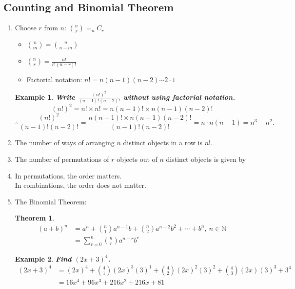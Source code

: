 \documentclass[12pt, a4paper]{article}
\newtheorem{theorem}{Theorem}[subsection]
\newtheorem{example}{Example}[subsection]
\begin{document}
\subsection{Counting and Binomial Theorem}
\begin{enumerate}
  \item Choose $r$ from $n$: {\color{red}$\binom{n}{r}=_nC_r$}
  \begin{itemize}
    \item {\color{red}$\binom{n}{m}=\binom{n}{n-m}$}
    \item {\color{red}$\binom{n}{r}=\frac{n!}{r!(n-r)!}$}
    \item Factorial notation: $n!=n(n-1)(n-2)\cdots 2\cdot 1$\\
  \end{itemize}
  \begin{example}
    \textbf{Write $\frac{(n!)^2}{(n-1)!(n-2)!}$ without using factorial notation.}
    $$(n!)^2=n!\times n!=n(n-1)!\times n(n-1)(n-2)!$$
    $$\therefore \frac{(n!)^2}{(n-1)!(n-2)!}=\frac{n(n-1)!\times n(n-1)(n-2)!}{(n-1)!(n-2)!}=n\cdot n(n-1)=n^3-n^2.$$
  \end{example}
  \item The number of ways of arranging $n$ distinct objects in a row is {\color{red}$n!$}.
  \item The number of permutations of $r$ objects out of $n$ distinct objects is given by {}
  \item In permutations, the order matters.\\ In combinations, the order does not matter.
  \item The Binomial Theorem: 
  \begin{theorem}
    {\color{red}$$\begin{aligned}
      (a+b)^n&=a^n+\binom{n}{1}a^{n-1}b+\binom{n}{2}a^{n-2}b^2+\cdots +b^n,\ n\in\mathbb{N}\\
      &=\sum\limits_{r=0}^n\binom{n}{r}a^{n-r}b^r
    \end{aligned}$$}
  \end{theorem}
  \begin{example}
    \textbf{Find $(2x+3)^4$.}
    $$\begin{aligned}
      (2x+3)^4&=(2x)^4+\binom{4}{1}(2x)^{3}(3)^1+\binom{4}{2}(2x)^{2}(3)^2+\binom{4}{3}(2x)(3)^3+3^4\\
      &=16x^4+96x^3+216x^2+216x+81

\end{aligned}$$
\end{example}
\end{enumerate}
\end{document}
